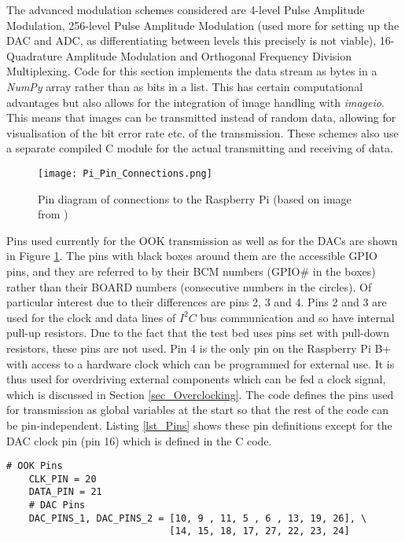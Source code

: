 \documentclass[../main.tex]{subfiles}
\begin{document}
The advanced modulation schemes considered are 4-level Pulse Amplitude Modulation, 256-level Pulse Amplitude Modulation (used more for setting up the DAC and ADC, as differentiating between levels this precisely is not viable), 16-Quadrature Amplitude Modulation and Orthogonal Frequency Division Multiplexing.
Code for this section implements the data stream as bytes in a \textit{NumPy} array rather than as bits in a list.
This has certain computational advantages but also allows for the integration of image handling with \textit{imageio}.
This means that images can be transmitted instead of random data, allowing for visualisation of the bit error rate etc. of the transmission.
These schemes also use a separate compiled C module for the actual transmitting and receiving of data.\\

\begin{figure}[ht]
 	\centering
 	\texttt{[image: Pi\_Pin\_Connections.png]}
 	\caption{Pin diagram of connections to the Raspberry Pi (based on image from \cite{web_GPIOPins})}
 	\label{fig_Pin Connections}
\end{figure}

Pins used currently for the OOK transmission as well as for the DACs are shown in Figure \ref{fig_Pin Connections}.
The pins with black boxes around them are the accessible GPIO pins, and they are referred to by their BCM numbers (GPIO\# in the boxes) rather than their BOARD numbers (consecutive numbers in the circles).
Of particular interest due to their differences are pins 2, 3 and 4.
Pins 2 and 3 are used for the clock and data lines of $I^2C$ bus communication and so have internal pull-up resistors.
Due to the fact that the test bed uses pins set with pull-down resistors, these pins are not used.
Pin 4 is the only pin on the Raspberry Pi B+ with access to a hardware clock which can be programmed for external use.
It is thus used for overdriving external components which can be fed a clock signal, which is discussed in Section \ref{sec_Overclocking}.
The code defines the pins used for transmission as global variables at the start so that the rest of the code can be pin-independent.
Listing \ref{lst_Pins} shows these pin definitions except for the DAC clock pin (pin 16) which is defined in the C code.\\

\begin{lstlisting}[caption={Pins used for OOK and the DACs}, label={lst_Pins}]
	# OOK Pins
	CLK_PIN = 20
	DATA_PIN = 21
	# DAC Pins
	DAC_PINS_1, DAC_PINS_2 = [10, 9 , 11, 5 , 6 , 13, 19, 26], \
							 [14, 15, 18, 17, 27, 22, 23, 24]
\end{lstlisting} 
\end{document}
